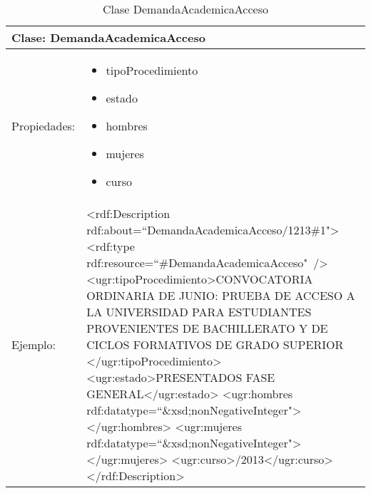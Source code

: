 \begin{table}[!ht]
	\centering
	\begin{tabular}{|p{}|p{}|}
		\hline
		\multicolumn{2}{|l|}{Clase: \textbf{DemandaAcademicaAcceso}}
		\\ \hline
		Propiedades:&
		\begin{itemize}
			\item tipoProcedimiento
			\item estado
			\item hombres
			\item mujeres
			\item curso
		\end{itemize}
		\\ \hline
		Ejemplo:&
		\textless rdf:Description \newline
		\tab rdf:about=``DemandaAcademicaAcceso/1213\#1"\textgreater \newline
		\tab \textless rdf:type rdf:resource=``\#DemandaAcademicaAcceso"\ /\textgreater \newline
		\tab \textless ugr:tipoProcedimiento\textgreater \newline\tab\tab CONVOCATORIA ORDINARIA DE JUNIO: PRUEBA DE ACCESO A LA UNIVERSIDAD PARA ESTUDIANTES PROVENIENTES DE BACHILLERATO Y DE CICLOS FORMATIVOS DE GRADO SUPERIOR \newline\tab\textless /ugr:tipoProcedimiento\textgreater \newline
		\tab \textless ugr:estado\textgreater \newline\tab\tab PRESENTADOS FASE GENERAL\newline\tab\textless /ugr:estado\textgreater  \newline
		\tab \textless ugr:hombres rdf:datatype=``\&xsd;nonNegativeInteger"\textgreater \newline\tab\tab2264 \newline \tab \textless /ugr:hombres\textgreater \newline
		\tab \textless ugr:mujeres rdf:datatype=``\&xsd;nonNegativeInteger"\textgreater \newline\tab\tab2877 \newline \tab \textless /ugr:mujeres\textgreater  \newline
		\tab \textless ugr:curso\textgreater \newline\tab\tab2012/2013\newline\tab\textless /ugr:curso\textgreater  \newline
		\textless /rdf:Description\textgreater 
		\\ \hline
	\end{tabular}
	\caption{Clase DemandaAcademicaAcceso}
	\label{clase-demandaacademicaacceso}
\end{table}

